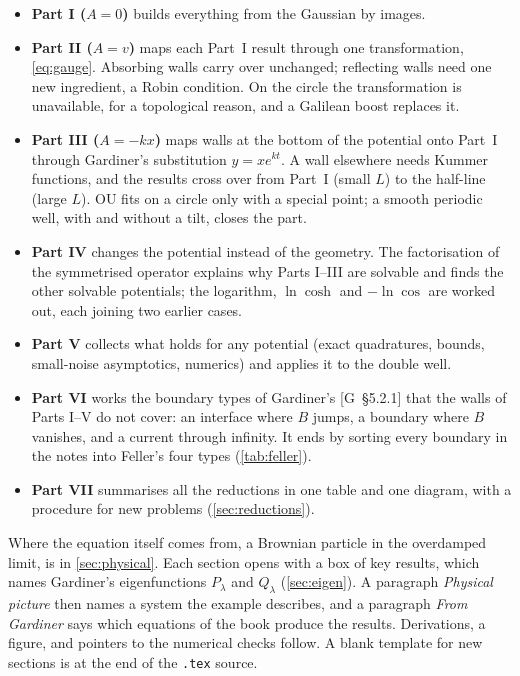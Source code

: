\documentclass[11pt]{article}
\numberwithin{equation}{section}
\newcommand{\Gs}[1]{[G~\S#1]}
\begin{document}
\begin{itemize}
  \item \textbf{Part I ($A=0$)} builds everything from the Gaussian by images.
  \item \textbf{Part II ($A=v$)} maps each Part~I result through one transformation, \cref{eq:gauge}.
        Absorbing walls carry over unchanged; reflecting walls need one new ingredient, a Robin condition. On
        the circle the transformation is unavailable, for a topological reason, and a Galilean boost
        replaces it.
  \item \textbf{Part III ($A=-kx$)} maps walls at the bottom of the potential onto Part~I through Gardiner's
        substitution $y=xe^{kt}$. A wall elsewhere needs Kummer functions, and the results cross over from
        Part~I (small $L$) to the half-line (large $L$). OU fits on a circle only with a special point; a smooth
        periodic well, with and without a tilt, closes the part.
  \item \textbf{Part IV} changes the potential instead of the geometry. The factorisation of the symmetrised
        operator explains why Parts I--III are solvable and finds the other solvable potentials; the logarithm,
        $\ln\cosh$ and $-\ln\cos$ are worked out, each joining two earlier cases.
  \item \textbf{Part V} collects what holds for any potential (exact quadratures, bounds, small-noise
        asymptotics, numerics) and applies it to the double well.
  \item \textbf{Part VI} works the boundary types of Gardiner's \Gs{5.2.1} that the walls of Parts I--V do not
        cover: an interface where $B$ jumps, a boundary where $B$ vanishes, and a current through infinity. It ends by
        sorting every boundary in the notes into Feller's four types (\cref{tab:feller}).
  \item \textbf{Part VII} summarises all the reductions in one table and one diagram, with a procedure for new
        problems (\cref{sec:reductions}).
\end{itemize}
Where the equation itself comes from, a Brownian particle in the overdamped limit, is in \cref{sec:physical}.
Each section opens with a box of key results, which names Gardiner's eigenfunctions $P_\lambda$ and $Q_\lambda$
(\cref{sec:eigen}). A paragraph \emph{Physical picture} then names a system the
example describes, and a paragraph \emph{From Gardiner} says which equations of the book produce the results.
Derivations, a figure, and pointers to the numerical checks follow. A
blank template for new sections is at the end of the \texttt{.tex} source.
\end{document}

